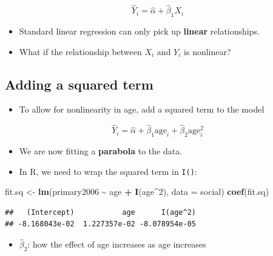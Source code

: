 \documentclass[
]{article}
\newenvironment{Shaded}{\begin{snugshade}}{\end{snugshade}}
\newcommand{\AttributeTok}[1]{\textcolor[rgb]{0.13,0.29,0.53}{#1}}
\newcommand{\DecValTok}[1]{\textcolor[rgb]{0.00,0.00,0.81}{#1}}
\newcommand{\FunctionTok}[1]{\textcolor[rgb]{0.13,0.29,0.53}{\textbf{#1}}}
\newcommand{\NormalTok}[1]{#1}
\newcommand{\OtherTok}[1]{\textcolor[rgb]{0.56,0.35,0.01}{#1}}
\newcommand{\SpecialCharTok}[1]{\textcolor[rgb]{0.81,0.36,0.00}{\textbf{#1}}}
\providecommand{\tightlist}{%
  \setlength{\itemsep}{0pt}\setlength{\parskip}{0pt}}
\begin{document}
\[
\hat{Y}_i = \hat{\alpha} + \hat{\beta}_1 X_i
\]

\begin{itemize}
\tightlist
\item
  Standard linear regression can only pick up \textbf{linear}
  relationships.
\item
  What if the relationship between \(X_i\) and \(Y_i\) is nonlinear?
\end{itemize}

\subsection{Adding a squared term}\label{adding-a-squared-term}

\begin{itemize}
\tightlist
\item
  To allow for nonlinearity in age, add a squared term to the model
\end{itemize}

\[
\hat{Y}_i = \hat{\alpha} + \hat{\beta}_1 \text{age}_i + \hat{\beta}_2 \text{age}_i^2
\]

\begin{itemize}
\tightlist
\item
  We are now fitting a \textbf{parabola} to the data.
\item
  In R, we need to wrap the squared term in \texttt{I()}:
\end{itemize}

\begin{Shaded}
\begin{Highlighting}[]
\NormalTok{fit.sq }\OtherTok{\textless{}{-}} \FunctionTok{lm}\NormalTok{(primary2006 }\SpecialCharTok{\textasciitilde{}}\NormalTok{ age }\SpecialCharTok{+} \FunctionTok{I}\NormalTok{(age}\SpecialCharTok{\^{}}\DecValTok{2}\NormalTok{), }\AttributeTok{data =}\NormalTok{ social)}
\FunctionTok{coef}\NormalTok{(fit.sq)}
\end{Highlighting}
\end{Shaded}

\begin{verbatim}
##   (Intercept)           age      I(age^2) 
## -8.168043e-02  1.227357e-02 -8.078954e-05
\end{verbatim}

\begin{itemize}
\tightlist
\item
  \(\hat{\beta}_2\): how the effect of age increases as age increases
\end{itemize}
\end{document}
